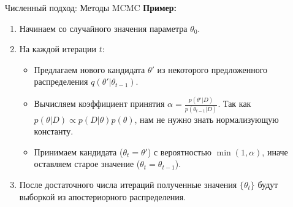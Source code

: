 \documentclass[notheorems, handout]{beamer}
\begin{document}
\begin{frame}{Численный подход: Методы MCMC}
    \textbf{Пример:}
    \begin{enumerate}
        \item Начинаем со случайного значения параметра $\theta_0$.
        \item На каждой итерации $t$:
        \begin{itemize}
            \item Предлагаем нового кандидата $\theta'$ из некоторого предложенного распределения $q(\theta'|\theta_{t-1})$.
            \item Вычисляем коэффициент принятия $\alpha = \frac{p(\theta'|D)}{p(\theta_{t-1}|D)}$. Так как $p(\theta|D) \propto p(D|\theta)p(\theta)$, нам не нужно знать нормализующую константу.
            \item Принимаем кандидата ($\theta_t = \theta'$) с вероятностью $\min(1, \alpha)$, иначе оставляем старое значение ($\theta_t = \theta_{t-1}$).
        \end{itemize}
        \item После достаточного числа итераций полученные значения $\{\theta_t\}$ будут выборкой из апостериорного распределения.
    \end{enumerate}
\end{frame}
\end{document}
